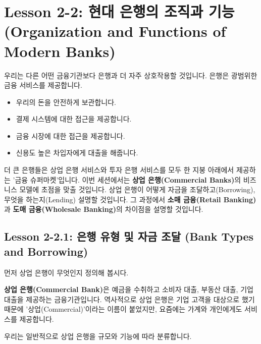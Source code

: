 \documentclass[11pt,a4paper]{book}
\theoremstyle{definition}
\begin{document}
\section{Lesson 2-2: 현대 은행의 조직과 기능 (Organization and Functions of Modern Banks)}

우리는 다른 어떤 금융기관보다 은행과 더 자주 상호작용할 것입니다. 은행은 광범위한 금융 서비스를 제공합니다.
\begin{itemize}
    \item 우리의 돈을 안전하게 보관합니다.
    \item 결제 시스템에 대한 접근을 제공합니다.
    \item 금융 시장에 대한 접근을 제공합니다.
    \item 신용도 높은 차입자에게 대출을 해줍니다.
\end{itemize}
더 큰 은행들은 상업 은행 서비스와 투자 은행 서비스를 모두 한 지붕 아래에서 제공하는 '금융 슈퍼마켓'입니다. 이번 세션에서는 \textbf{상업 은행(Commercial Banks)}의 비즈니스 모델에 초점을 맞출 것입니다. 상업 은행이 어떻게 자금을 조달하고(Borrowing), 무엇을 하는지(Lending) 설명할 것입니다. 그 과정에서 \textbf{소매 금융(Retail Banking)}과 \textbf{도매 금융(Wholesale Banking)}의 차이점을 설명할 것입니다.

\subsection{Lesson 2-2.1: 은행 유형 및 자금 조달 (Bank Types and Borrowing)}

먼저 상업 은행이 무엇인지 정의해 봅시다.
\begin{summarybox}[title={상업 은행의 정의}]
\textbf{상업 은행(Commercial Bank)}은 예금을 수취하고 소비자 대출, 부동산 대출, 기업 대출을 제공하는 금융기관입니다. 역사적으로 상업 은행은 기업 고객을 대상으로 했기 때문에 '상업(Commercial)'이라는 이름이 붙었지만, 요즘에는 가계와 개인에게도 서비스를 제공합니다.
\end{summarybox}

우리는 일반적으로 상업 은행을 규모와 기능에 따라 분류합니다.
\end{document}
